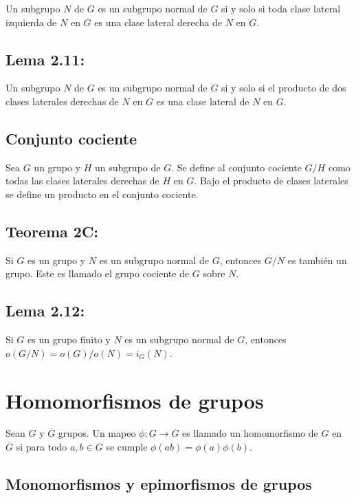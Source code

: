 \documentclass{article}
\begin{document}
Un subgrupo $N$ de $G$ es un subgrupo normal de $G$ si y solo si toda clase lateral izquierda de $N$ en $G$ es una clase lateral derecha de $N$ en $G$.

\subsection*{\color{blue} Lema 2.11:}

Un subgrupo $N$ de $G$ es un subgrupo normal de $G$ si y solo si el producto de dos clases laterales derechas de $N$ en $G$ es una clase lateral de $N$ en $G$.

\subsection*{\color{violet} Conjunto cociente}

Sea $G$ un grupo y $H$ un subgrupo de $G$. Se define al conjunto cociente $G/H$ como todas las clases laterales derechas de $H$ en $G$. Bajo el producto de clases laterales se define un producto en el conjunto cociente.

\subsection*{\color{red} Teorema 2C:}

Si $G$ es un grupo y $N$ es un subgrupo normal de $G$, entonces $G/N$ es también un grupo. Este es llamado el grupo cociente de $G$ sobre $N$.

\subsection*{\color{blue} Lema 2.12:}

Si $G$ es un grupo finito y $N$ es un subgrupo normal de $G$, entonces $o(G/N)=o(G)/o(N)=i_G(N)$.

\newpage
\section{Homomorfismos de grupos}

Sean $G$ y $\overline{G}$ grupos. Un mapeo $\phi:G\to\overline{G}$ es llamado un homomorfismo de $G$ en $\overline{G}$ si para todo $a,b\in G$ se cumple $\phi(ab)=\phi(a)\phi(b)$.

\subsection*{\color{violet} Monomorfismos y epimorfismos de grupos}
\end{document}
